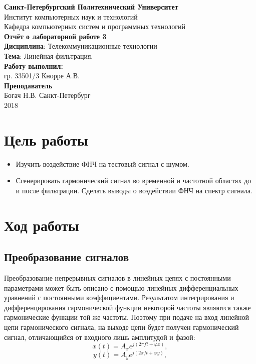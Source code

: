 \documentclass[a4paper,14pt]{extarticle}
\begin{document}
\begin{titlepage}
\centering 
{\bfseries Санкт-Петербургский Политехнический Университет} \\
Институт компьютерных наук и технологий \\
Кафедра компьютерных систем и программных технологий \\
\vspace{5cm}
{\centering \textbf{Отчёт о лабораторной работе 3} \\ 
\vspace{0.2cm}
\textbf{Дисциплина}: Телекоммуникационные технологии \\
\vspace{0.2cm}
\textbf{Тема}: Линейная фильтрация.} \\
\vspace{4cm}
\hfill {\bfseries Работу выполнил:}  \\
\hfill гр. 33501/3 Кнорре А.В. \\
\hfill {\bfseries Преподаватель}  \\
\hfill Богач Н.В.
\vfill
Санкт-Петербург \\
{\large 2018}
\end{titlepage}

\section{Цель работы}
\begin{itemize}
\item Изучить воздействие ФНЧ на тестовый сигнал с шумом. 

\item Сгенерировать гармонический сигнал во временной и частотной областях до и после фильтрации. Сделать выводы о воздействии ФНЧ на спектр сигнала.
\end{itemize}

\section{Ход работы}

\subsection{Преобразование сигналов}

Преобразование непрерывных сигналов в линейных цепях с постоянными параметрами может быть описано с помощью линейных дифференциальных уравнений с постоянными коэффициентами. Результатом интегрирования и дифференцирования гармонической функции некоторой частоты являются также гармонические функции той же частоты. Поэтому при подаче на вход линейной цепи гармонического сигнала, на выходе цепи будет получен гармонический сигнал, отличающийся от входного лишь амплитудой и фазой: 
\begin{equation*}
x(t) = A_x e^{j (2 \pi f t + \varphi x)} ,
\label{f1}
\end{equation*}
\begin{equation*}
y(t) = A_y e^{j (2 \pi f t + \varphi y)} ,
\label{f2}
\end{equation*}
\end{document}

